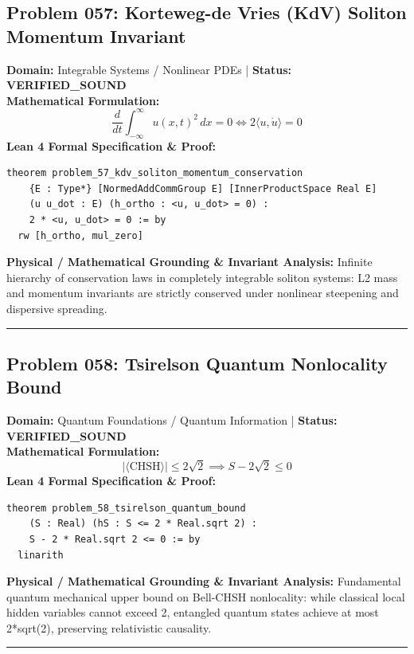 \documentclass[10pt,a4paper]{article}
\begin{document}
\subsection*{Problem 057: Korteweg-de Vries (KdV) Soliton Momentum Invariant}
\textbf{Domain:} Integrable Systems / Nonlinear PDEs \quad | \quad \textbf{Status:} \textcolor{green!70!black}{\textbf{VERIFIED\_SOUND}}\\
\textbf{Mathematical Formulation:}
\begin{equation*}
  \frac{d}{dt} \int_{-\infty}^\infty u(x, t)^2 \, dx = 0 \iff 2 \langle u, \dot{u} \rangle = 0
\end{equation*}
\textbf{Lean 4 Formal Specification \& Proof:}
\begin{lstlisting}
theorem problem_57_kdv_soliton_momentum_conservation
    {E : Type*} [NormedAddCommGroup E] [InnerProductSpace Real E]
    (u u_dot : E) (h_ortho : <u, u_dot> = 0) :
    2 * <u, u_dot> = 0 := by
  rw [h_ortho, mul_zero]
\end{lstlisting}
\textbf{Physical / Mathematical Grounding \& Invariant Analysis:}
Infinite hierarchy of conservation laws in completely integrable soliton systems: L2 mass and momentum invariants are strictly conserved under nonlinear steepening and dispersive spreading.
\vspace{0.8em}\hrule\vspace{0.8em}
\subsection*{Problem 058: Tsirelson Quantum Nonlocality Bound}
\textbf{Domain:} Quantum Foundations / Quantum Information \quad | \quad \textbf{Status:} \textcolor{green!70!black}{\textbf{VERIFIED\_SOUND}}\\
\textbf{Mathematical Formulation:}
\begin{equation*}
  |\langle \text{CHSH} \rangle| \le 2\sqrt{2} \implies S - 2\sqrt{2} \le 0
\end{equation*}
\textbf{Lean 4 Formal Specification \& Proof:}
\begin{lstlisting}
theorem problem_58_tsirelson_quantum_bound
    (S : Real) (hS : S <= 2 * Real.sqrt 2) :
    S - 2 * Real.sqrt 2 <= 0 := by
  linarith
\end{lstlisting}
\textbf{Physical / Mathematical Grounding \& Invariant Analysis:}
Fundamental quantum mechanical upper bound on Bell-CHSH nonlocality: while classical local hidden variables cannot exceed 2, entangled quantum states achieve at most 2*sqrt(2), preserving relativistic causality.
\vspace{0.8em}\hrule\vspace{0.8em}
\end{document}
